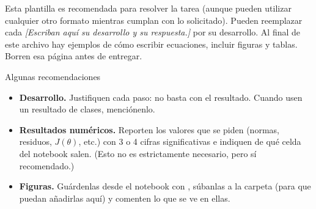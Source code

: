 \documentclass{article}
\newcommand\grupo{2}   %
\newcommand\pendiente{{\color{gris90}\itshape [Escriban aquí su desarrollo y su respuesta.]}}
\begin{document}
\portada[Grupo \grupo]


\begin{nota}[Indicaciones]
  Esta plantilla es recomendada para resolver la tarea (aunque pueden utilizar cualquier otro formato mientras cumplan con lo solicitado).
  Pueden reemplazar cada \pendiente{} por su desarrollo.
  Al final de este archivo hay ejemplos de cómo escribir ecuaciones, incluir figuras y tablas. Borren esa página antes de entregar.
\end{nota}

Algunas recomendaciones
\begin{itemize}
  \item \textbf{Desarrollo.} Justifiquen cada paso: no basta con el resultado. Cuando usen un resultado de clases, menciónenlo.
  \item \textbf{Resultados numéricos.} Reporten los valores que se piden (normas, residuos, $J(\theta)$, etc.) con 3 o 4 cifras significativas e indiquen de qué celda del notebook salen. (Esto no es estrictamente necesario, pero sí recomendado.)
  \item \textbf{Figuras.} Guárdenlas desde el notebook con , súbanlas a la carpeta  (para que puedan añadirlas aquí) y comenten lo que se ve en ellas.
\end{itemize}
\despueslista


\end{document}
